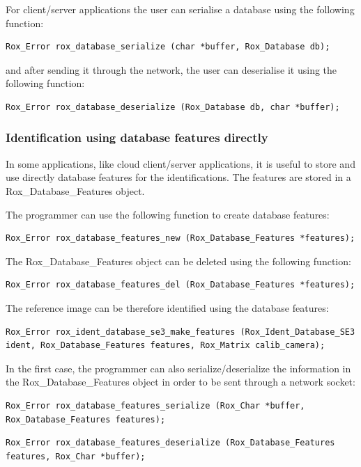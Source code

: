 For client/server applications the user can serialise a database using the following function:
\begin{lstlisting}
Rox_Error rox_database_serialize (char *buffer, Rox_Database db);
\end{lstlisting}
and after sending it through the network, the user can deserialise it using the following function:
\begin{lstlisting}
Rox_Error rox_database_deserialize (Rox_Database db, char *buffer);
\end{lstlisting}

\subsubsection{Identification using database features directly}

In some applications, like cloud client/server applications, it is useful to store and use directly database features for the identifications. The features are stored in a Rox\_Database\_Features object. 

The programmer can use the following function to create database features:
\begin{lstlisting}
Rox_Error rox_database_features_new (Rox_Database_Features *features);
\end{lstlisting}

The Rox\_Database\_Features object can be deleted using the following function:
\begin{lstlisting}
Rox_Error rox_database_features_del (Rox_Database_Features *features);
\end{lstlisting}

The reference image can be therefore identified using the database features:
\begin{lstlisting}
Rox_Error rox_ident_database_se3_make_features (Rox_Ident_Database_SE3 ident, Rox_Database_Features features, Rox_Matrix calib_camera);
\end{lstlisting}


In the first case, the programmer can also serialize/deserialize the information in the Rox\_Database\_Features object in order to be sent through a network socket: 
\begin{lstlisting}
Rox_Error rox_database_features_serialize (Rox_Char *buffer, Rox_Database_Features features);
\end{lstlisting}

\begin{lstlisting}
Rox_Error rox_database_features_deserialize (Rox_Database_Features features, Rox_Char *buffer);
\end{lstlisting}

